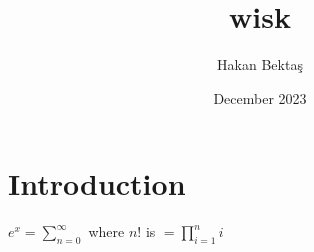 \documentclass{article}
\title{wisk}
\author{Hakan Bektaş}
\date{December 2023}
\begin{document}
\maketitle

\section{Introduction}

\noindent $e^x = \sum_{n=0}^{\infty}$ where $n!$ is $= \prod_{i=1}^{n} i$
\end{document}

